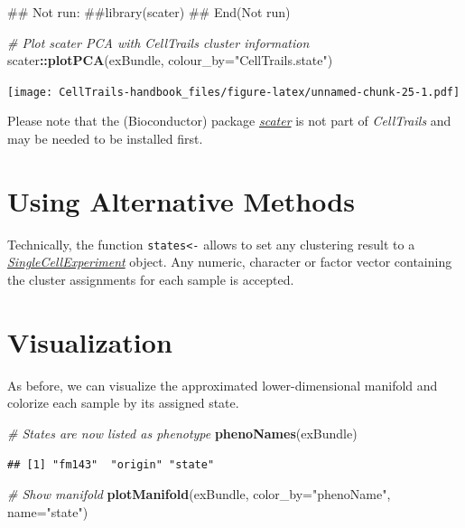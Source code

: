 \documentclass[]{book}
\newenvironment{Shaded}{\begin{snugshade}}{\end{snugshade}}
\newcommand{\KeywordTok}[1]{\textcolor[rgb]{0.13,0.29,0.53}{\textbf{#1}}}
\newcommand{\DataTypeTok}[1]{\textcolor[rgb]{0.13,0.29,0.53}{#1}}
\newcommand{\StringTok}[1]{\textcolor[rgb]{0.31,0.60,0.02}{#1}}
\newcommand{\CommentTok}[1]{\textcolor[rgb]{0.56,0.35,0.01}{\textit{#1}}}
\newcommand{\OperatorTok}[1]{\textcolor[rgb]{0.81,0.36,0.00}{\textbf{#1}}}
\newcommand{\NormalTok}[1]{#1}
\theoremstyle{definition}
\theoremstyle{definition}
\theoremstyle{definition}
\theoremstyle{remark}
\begin{document}
\begin{Shaded}
\begin{Highlighting}[]
\NormalTok{## Not run: }
\NormalTok{##library(scater)}
\NormalTok{## End(Not run)}

\CommentTok{# Plot scater PCA with CellTrails cluster information}
\NormalTok{scater}\OperatorTok{::}\KeywordTok{plotPCA}\NormalTok{(exBundle, }\DataTypeTok{colour_by=}\StringTok{"CellTrails.state"}\NormalTok{)}
\end{Highlighting}
\end{Shaded}

\texttt{[image: CellTrails-handbook\_files/figure-latex/unnamed-chunk-25-1.pdf]}

Please note that the (Bioconductor) package
\emph{\href{http://bioconductor.org/packages/scater}{scater}} is not
part of \emph{CellTrails} and may be needed to be installed first.

\section{Using Alternative Methods}\label{using-alternative-methods-2}

Technically, the function \texttt{states\textless{}-} allows to set any
clustering result to a
\emph{\href{http://bioconductor.org/packages/SingleCellExperiment}{SingleCellExperiment}}
object. Any numeric, character or factor vector containing the cluster
assignments for each sample is accepted.

\section{Visualization}\label{visualization-1}

As before, we can visualize the approximated lower-dimensional manifold
and colorize each sample by its assigned state.

\begin{Shaded}
\begin{Highlighting}[]
\CommentTok{# States are now listed as phenotype}
\KeywordTok{phenoNames}\NormalTok{(exBundle)}
\end{Highlighting}
\end{Shaded}

\begin{verbatim}
## [1] "fm143"  "origin" "state"
\end{verbatim}

\begin{Shaded}
\begin{Highlighting}[]
\CommentTok{# Show manifold}
\KeywordTok{plotManifold}\NormalTok{(exBundle, }\DataTypeTok{color_by=}\StringTok{"phenoName"}\NormalTok{, }\DataTypeTok{name=}\StringTok{"state"}\NormalTok{)}
\end{Highlighting}
\end{Shaded}
\end{document}

